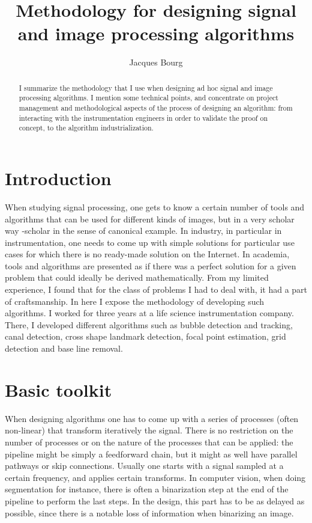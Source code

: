 \documentclass[24pt]{article}
\title{Methodology for designing signal and image processing algorithms}
\author{Jacques Bourg}
\begin{document}
\maketitle

\begin{abstract}
  I summarize the methodology that I use when designing ad hoc signal and image processing algorithms. I mention some technical points, and  concentrate on project management and methodological aspects of the process of designing an algorithm: from  interacting with the instrumentation engineers in order to validate the proof on concept,  to the algorithm industrialization.
  
\end{abstract}


\section{Introduction}
 
When studying signal processing, one gets to know  a certain number of tools and algorithms that can be used for different kinds of images, but in a very scholar way -scholar in the sense of canonical example. In industry, in particular in instrumentation, one needs to come up with simple solutions for particular use cases for which there is no ready-made solution on the Internet. In academia, tools and algorithms are presented as if there was a perfect solution for a given problem that could ideally be derived mathematically. From my limited experience, I found that for the class of problems I had to deal with, it had a part of craftsmanship.  In here I expose the methodology of developing such algorithms. I worked for three years  at a life science instrumentation company. There,  I developed different algorithms such as bubble detection and tracking, canal detection, cross shape landmark detection, focal point estimation,  grid detection and base line removal.  
   
\section{Basic toolkit}

When designing algorithms one has to come up with a series of processes (often non-linear) that transform iteratively the signal. There is no restriction on the number of processes or on the nature of the processes that can be applied: the pipeline might be simply a feedforward chain, but it might as  well have parallel pathways or skip connections. Usually one starts with a signal sampled at a certain frequency, and applies certain transforms. In computer vision, when doing segmentation for instance, there is often a binarization step at the end of the pipeline to perform the last steps. In the design, this part has to be as delayed as possible, since there is a notable loss of information when binarizing an image. 
\end{document}
